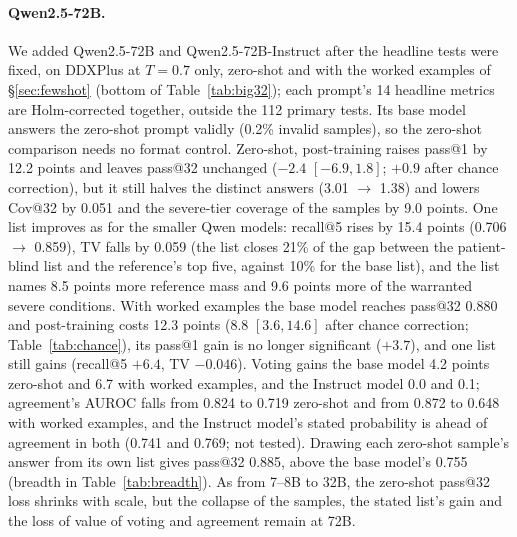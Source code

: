 \documentclass[11pt]{article}
\begin{document}
\paragraph{Qwen2.5-72B.} We added Qwen2.5-72B and Qwen2.5-72B-Instruct after the headline tests were fixed, on DDXPlus at $T{=}0.7$ only, zero-shot and with the worked examples of \S\ref{sec:fewshot} (bottom of Table~\ref{tab:big32}); each prompt's 14 headline metrics are Holm-corrected together, outside the 112 primary tests. Its base model answers the zero-shot prompt validly (0.2\% invalid samples), so the zero-shot comparison needs no format control. Zero-shot, post-training raises pass@1 by 12.2 points and leaves pass@32 unchanged ($-2.4$ $[-6.9,1.8]$; $+0.9$ after chance correction), but it still halves the distinct answers (3.01 $\rightarrow$ 1.38) and lowers Cov@32 by 0.051 and the severe-tier coverage of the samples by 9.0 points. One list improves as for the smaller Qwen models: recall@5 rises by 15.4 points (0.706 $\rightarrow$ 0.859), TV falls by 0.059 (the list closes 21\% of the gap between the patient-blind list and the reference's top five, against 10\% for the base list), and the list names 8.5 points more reference mass and 9.6 points more of the warranted severe conditions. With worked examples the base model reaches pass@32 0.880 and post-training costs 12.3 points (8.8 $[3.6,14.6]$ after chance correction; Table~\ref{tab:chance}), its pass@1 gain is no longer significant ($+3.7$), and one list still gains (recall@5 $+6.4$, TV $-0.046$). Voting gains the base model 4.2 points zero-shot and 6.7 with worked examples, and the Instruct model 0.0 and 0.1; agreement's AUROC falls from 0.824 to 0.719 zero-shot and from 0.872 to 0.648 with worked examples, and the Instruct model's stated probability is ahead of agreement in both (0.741 and 0.769; not tested). Drawing each zero-shot sample's answer from its own list gives pass@32 0.885, above the base model's 0.755 (breadth in Table~\ref{tab:breadth}). As from 7--8B to 32B, the zero-shot pass@32 loss shrinks with scale, but the collapse of the samples, the stated list's gain and the loss of value of voting and agreement remain at 72B.
\end{document}
